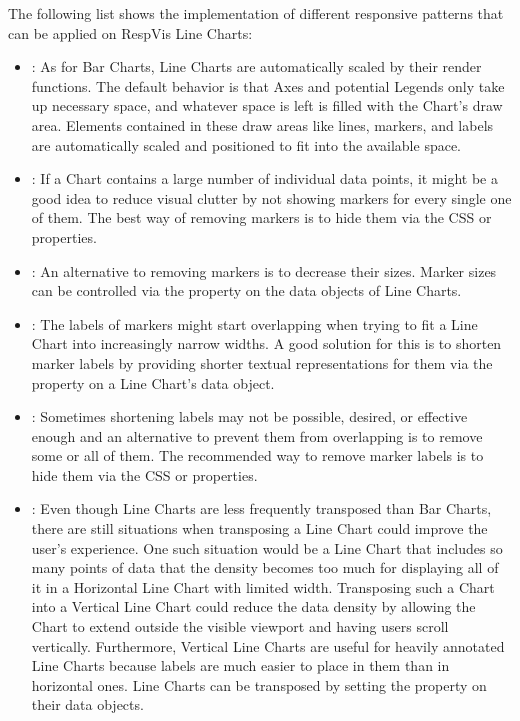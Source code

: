 The following list shows the implementation of different responsive
patterns that can be applied on RespVis Line Charts:
\begin{itemize}
\item {}: As for Bar Charts, Line Charts are
  automatically scaled by their render functions.  The default
  behavior is that Axes and potential Legends only take up necessary
  space, and whatever space is left is filled with the Chart's draw
  area.  Elements contained in these draw areas like lines, markers,
  and labels are automatically scaled and positioned to fit into the
  available space.

\item {}: If a Chart contains a large number of
  individual data points, it might be a good idea to reduce visual
  clutter by not showing markers for every single one of them.  The
  best way of removing markers is to hide them via the CSS
   or  properties.

\item {}: An alternative to removing markers is
  to decrease their sizes.  Marker sizes can be controlled via the
   property on the data objects of Line Charts.

\item {}: The labels of markers might
  start overlapping when trying to fit a Line Chart into increasingly
  narrow widths.  A good solution for this is to shorten marker labels
  by providing shorter textual representations for them via the
   property on a Line Chart's data object.

\item {}: Sometimes shortening labels may not be
  possible, desired, or effective enough and an alternative to prevent
  them from overlapping is to remove some or all of them.  The
  recommended way to remove marker labels is to hide them via the CSS
   or  properties.

\item {}: Even though Line Charts are less
  frequently transposed than Bar Charts, there are still situations
  when transposing a Line Chart could improve the user's experience.
  One such situation would be a Line Chart that includes so many
  points of data that the density becomes too much for displaying all
  of it in a Horizontal Line Chart with limited width.  Transposing
  such a Chart into a Vertical Line Chart could reduce the data
  density by allowing the Chart to extend outside the visible viewport
  and having users scroll vertically.  Furthermore, Vertical Line
  Charts are useful for heavily annotated Line Charts because labels
  are much easier to place in them than in horizontal ones.  Line
  Charts can be transposed by setting the  property on
  their data objects.


\end{itemize}
